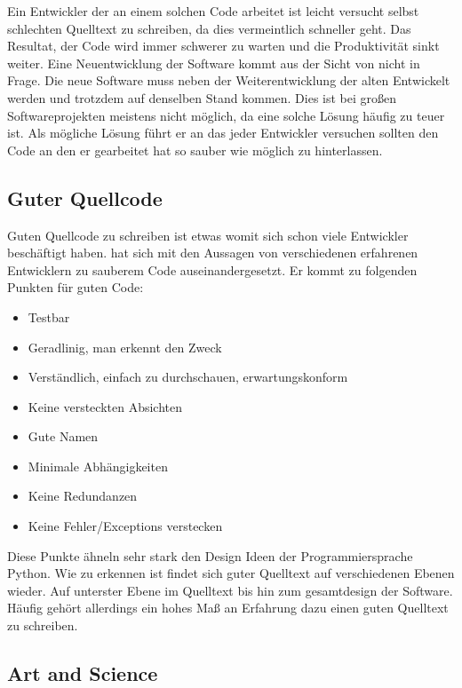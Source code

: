 Ein Entwickler der an einem solchen Code arbeitet ist leicht versucht selbst schlechten Quelltext zu schreiben,
da dies vermeintlich schneller geht. Das Resultat, der Code wird immer schwerer zu warten und die Produktivität sinkt weiter.
Eine Neuentwicklung der Software kommt aus der Sicht von \cite[S. 29f.]{Martin} nicht in Frage.
Die neue Software muss neben der Weiterentwicklung der alten Entwickelt werden und trotzdem auf denselben Stand kommen.
Dies ist bei großen Softwareprojekten meistens nicht möglich, da eine solche Lösung häufig zu teuer ist.
Als mögliche Lösung führt er an das jeder Entwickler versuchen sollten den Code an den er gearbeitet hat so sauber wie möglich zu hinterlassen.

\subsection{Guter Quellcode}

Guten Quellcode zu schreiben ist etwas womit sich schon viele Entwickler beschäftigt haben\cite{Martin, Green, Spinellis, reed}.
\cite[S. 32f.]{Martin} hat sich mit den Aussagen von verschiedenen erfahrenen Entwicklern zu sauberem Code auseinandergesetzt.
Er kommt zu folgenden Punkten für guten Code:

\begin{itemize}
\item Testbar
\item Geradlinig, man erkennt den Zweck
\item Verständlich, einfach zu durchschauen, erwartungskonform
\item Keine versteckten Absichten
\item Gute Namen
\item Minimale Abhängigkeiten
\item Keine Redundanzen
\item Keine Fehler/Exceptions verstecken
\end{itemize}

Diese Punkte ähneln sehr stark den Design Ideen der Programmiersprache Python\cite{Peters}.
Wie zu erkennen ist findet sich guter Quelltext auf verschiedenen Ebenen wieder.
Auf unterster Ebene im Quelltext bis hin zum gesamtdesign der Software.
Häufig gehört allerdings ein hohes Maß an Erfahrung dazu einen guten Quelltext zu schreiben.

\subsection{Art and Science}

